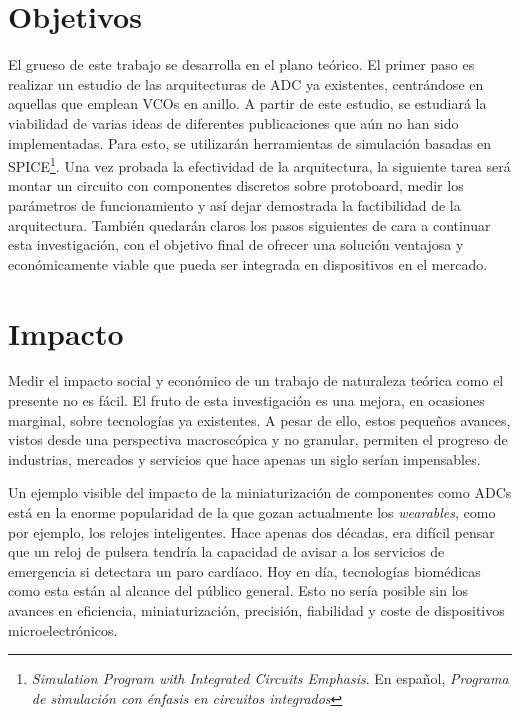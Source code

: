 \documentclass[12pt]{report} %
\begin{document}
	\section{Objetivos}
	
	El grueso de este trabajo se desarrolla en el plano teórico. El primer paso es realizar un estudio de las arquitecturas de ADC ya existentes, centrándose en aquellas que emplean VCOs en anillo. A partir de este estudio, se estudiará la viabilidad de varias ideas de diferentes publicaciones que aún no han sido implementadas. Para esto, se utilizarán herramientas de simulación basadas en SPICE\footnote{\textit{Simulation Program with Integrated Circuits Emphasis}. En español, \textit{Programa de simulación con énfasis en circuitos integrados}}. Una vez probada la efectividad de la arquitectura, la siguiente tarea será montar un circuito con componentes discretos sobre protoboard, medir los parámetros de funcionamiento y así dejar demostrada la factibilidad de la arquitectura. También quedarán claros los pasos siguientes de cara a continuar esta investigación, con el objetivo final de ofrecer una solución ventajosa y económicamente viable que pueda ser integrada en dispositivos en el mercado.
	
	\section{Impacto}\label{st:impact}
	
	
	Medir el impacto social y económico de un trabajo de naturaleza teórica como el presente no es fácil. El fruto de esta investigación es una mejora, en ocasiones marginal, sobre tecnologías ya existentes. A pesar de ello, estos pequeños avances, vistos desde una perspectiva macroscópica y no granular, permiten el progreso de industrias, mercados y servicios que hace apenas un siglo serían impensables.
	
	Un ejemplo visible del impacto de la miniaturización de componentes como ADCs está en la enorme popularidad de la que gozan actualmente los \textit{wearables}, como por ejemplo, los relojes inteligentes. Hace apenas dos décadas, era difícil pensar que un reloj de pulsera tendría la capacidad de avisar a los servicios de emergencia si detectara un paro cardíaco. Hoy en día, tecnologías biomédicas como esta están al alcance del público general. Esto no sería posible sin los avances en eficiencia, miniaturización, precisión, fiabilidad y coste de dispositivos microelectrónicos. 
	
\end{document}
